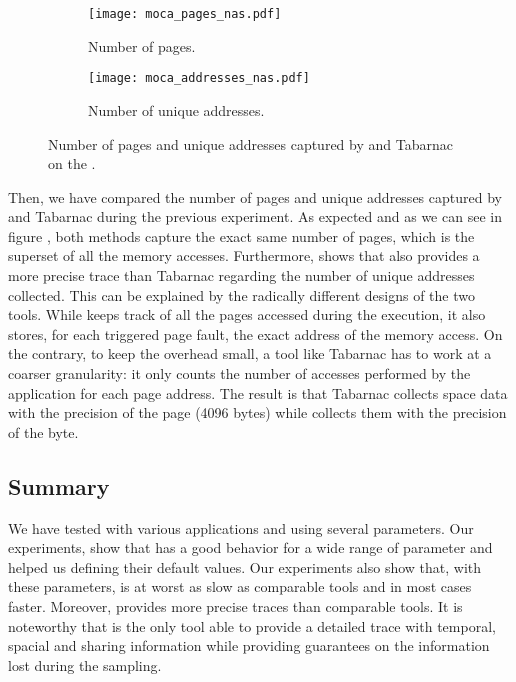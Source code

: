 \begin{figure}[htb]
    \centering
    \begin{subfigure}{\linewidth}
        \texttt{[image: moca\_pages\_nas.pdf]}
        \caption{Number of pages.}
        \label{fig:pages}
    \end{subfigure}
    \begin{subfigure}{\linewidth}
        \texttt{[image: moca\_addresses\_nas.pdf]}
        \caption{Number of unique addresses.}
        \label{fig:addr}
    \end{subfigure}
    \caption{Number of pages and unique addresses captured by \Moca and Tabarnac
    on the \NPB.}
    \label{fig:pages-addr}
\end{figure}

Then, we have compared the number of pages and unique addresses captured by \Moca
and Tabarnac during the previous experiment. As expected and as we can see in figure
, both methods capture the exact same number of
pages, which is the superset of all the memory accesses. Furthermore,
 shows that \Moca also provides a more precise trace than Tabarnac
regarding the number of unique addresses collected. This can be explained by the 
radically different designs of the two tools. While \Moca keeps track of all
the pages accessed during the execution, it also stores, for each triggered page fault, the
exact address of the memory access. On the contrary, to keep the overhead small,
a tool like Tabarnac has to work at a coarser granularity: it only counts the number
of accesses performed by the application for each page address. The result is that Tabarnac
collects space data with the precision of the page (4096 bytes) while \Moca collects them with
the precision of the byte.

\subsection{Summary}
\label{sec:expe-cncl}

We have tested \Moca with various applications and using several parameters.
Our experiments, show that \Moca has a good behavior for a wide range of parameter and
helped us defining their default values. Our experiments also show that, with these
parameters, \Moca is at worst as slow as comparable tools and in most 
cases faster. Moreover, \Moca provides more precise traces than comparable tools.
It is noteworthy that \Moca is the only tool able to provide a detailed trace with temporal,
spacial and sharing information while providing guarantees on the information
lost during the sampling.
